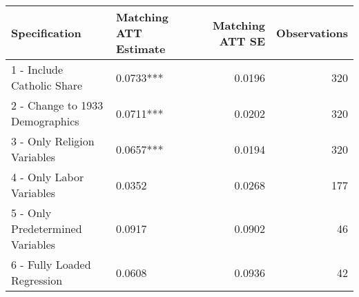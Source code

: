 \begin{tabular}{llrr}
\toprule
                   Specification & Matching ATT Estimate &  Matching ATT SE &  Observations \\
\midrule
      1 - Include Catholic Share &             0.0733*** &           0.0196 &           320 \\
 2 - Change to 1933 Demographics &             0.0711*** &           0.0202 &           320 \\
     3 - Only Religion Variables &             0.0657*** &           0.0194 &           320 \\
        4 - Only Labor Variables &                0.0352 &           0.0268 &           177 \\
5 - Only Predetermined Variables &                0.0917 &           0.0902 &            46 \\
     6 - Fully Loaded Regression &                0.0608 &           0.0936 &            42 \\
\bottomrule
\end{tabular}
